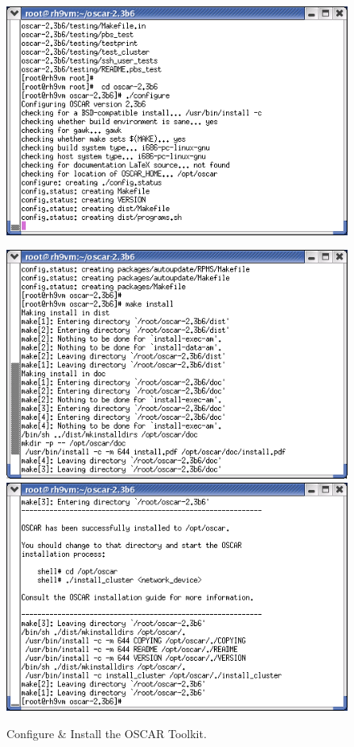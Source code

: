 \begin{figure}[!ht]
  \begin{center}
    \centerline{\includegraphics[scale=\imgscale]{figs/sbs-configure-install}}
      \vspace{\imgvskip}
	\centerline{
      \includegraphics[scale=\imgscale]{figs/sbs-make-install-1}
      \hspace{\imghskip}
      \includegraphics[scale=\imgscale]{figs/sbs-make-install-2}
      }
    \caption{Configure \& Install the OSCAR Toolkit.}
    \label{fig:sbs-configure-install}
  \end{center}
\end{figure}

